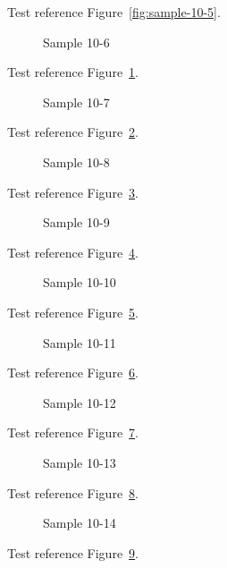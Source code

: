 Test reference Figure~\ref{fig:sample-10-5}.

\begin{figure}[tbhp]
\caption{Sample 10-6}
\label{fig:sample-10-6}
\end{figure}

Test reference Figure~\ref{fig:sample-10-6}.

\begin{figure}[tbhp]
\caption{Sample 10-7}
\label{fig:sample-10-7}
\end{figure}

Test reference Figure~\ref{fig:sample-10-7}.

\begin{figure}[tbhp]
\caption{Sample 10-8}
\label{fig:sample-10-8}
\end{figure}

Test reference Figure~\ref{fig:sample-10-8}.

\begin{figure}[tbhp]
\caption{Sample 10-9}
\label{fig:sample-10-9}
\end{figure}

Test reference Figure~\ref{fig:sample-10-9}.

\begin{figure}[tbhp]
\caption{Sample 10-10}
\label{fig:sample-10-10}
\end{figure}

Test reference Figure~\ref{fig:sample-10-10}.

\begin{figure}[tbhp]
\caption{Sample 10-11}
\label{fig:sample-10-11}
\end{figure}

Test reference Figure~\ref{fig:sample-10-11}.

\begin{figure}[tbhp]
\caption{Sample 10-12}
\label{fig:sample-10-12}
\end{figure}

Test reference Figure~\ref{fig:sample-10-12}.

\begin{figure}[tbhp]
\caption{Sample 10-13}
\label{fig:sample-10-13}
\end{figure}

Test reference Figure~\ref{fig:sample-10-13}.

\begin{figure}[tbhp]
\caption{Sample 10-14}
\label{fig:sample-10-14}
\end{figure}

Test reference Figure~\ref{fig:sample-10-14}.

